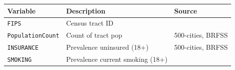 \documentclass[
]{book}
\newcommand{\passthrough}[1]{#1}
\begin{document}
\begin{longtable}[]{@{}lll@{}}
\toprule
\begin{minipage}[b]{0.19\columnwidth}\raggedright
Variable\strut
\end{minipage} & \begin{minipage}[b]{0.29\columnwidth}\raggedright
Description\strut
\end{minipage} & \begin{minipage}[b]{0.43\columnwidth}\raggedright
Source\strut
\end{minipage}\tabularnewline
\midrule
\endhead
\begin{minipage}[t]{0.19\columnwidth}\raggedright
\passthrough{\lstinline!FIPS!}\strut
\end{minipage} & \begin{minipage}[t]{0.29\columnwidth}\raggedright
Census tract ID\strut
\end{minipage} & \begin{minipage}[t]{0.43\columnwidth}\raggedright
\strut
\end{minipage}\tabularnewline
\begin{minipage}[t]{0.19\columnwidth}\raggedright
\passthrough{\lstinline!PopulationCount!}\strut
\end{minipage} & \begin{minipage}[t]{0.29\columnwidth}\raggedright
Count of tract pop\strut
\end{minipage} & \begin{minipage}[t]{0.43\columnwidth}\raggedright
500-cities, BRFSS\strut
\end{minipage}\tabularnewline
\begin{minipage}[t]{0.19\columnwidth}\raggedright
\passthrough{\lstinline!INSURANCE!}\strut
\end{minipage} & \begin{minipage}[t]{0.29\columnwidth}\raggedright
Prevalence uninsured (18+)\strut
\end{minipage} & \begin{minipage}[t]{0.43\columnwidth}\raggedright
500-cities, BRFSS\strut
\end{minipage}\tabularnewline
\begin{minipage}[t]{0.19\columnwidth}\raggedright
\passthrough{\lstinline!SMOKING!}\strut
\end{minipage} & \begin{minipage}[t]{0.29\columnwidth}\raggedright
Prevalence current smoking (18+)\strut
\end{minipage} & \begin{minipage}[t]{0.43\columnwidth}\raggedright

\end{minipage}
\end{longtable}
\end{document}
